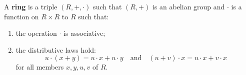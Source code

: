 A \textbf{ring} is a triple $(R, +, \cdot)$ such that $(R, +)$ is an abelian group and $\cdot$ is a function on $R \times R$ to $R$ such that:
\begin{enumerate}
\item the operation $\cdot$ is associative;
\item the distributive laws hold:
$$u \cdot (x + y) = u \cdot x + u \cdot y \quad \text{and} \quad (u + v) \cdot x = u \cdot x + v \cdot x$$
for all members $x, y, u, v$ of $R$.
\end{enumerate}
